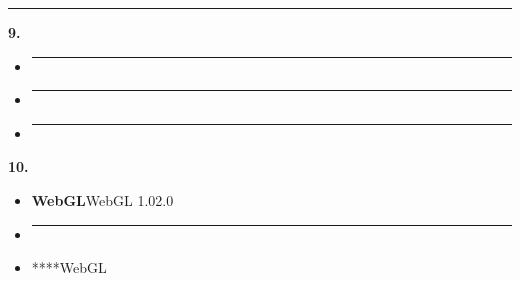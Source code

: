 \begin{center}\rule{0.5\linewidth}{0.5pt}\end{center}

\textbf{9. }

\begin{itemize}
\item
  \begin{center}\rule{0.5\linewidth}{0.5pt}\end{center}
\item
  \begin{center}\rule{0.5\linewidth}{0.5pt}\end{center}
\item
  \begin{center}\rule{0.5\linewidth}{0.5pt}\end{center}
\end{itemize}

\textbf{10. }

\begin{itemize}
\item
  \textbf{WebGL}WebGL 1.02.0
\item
  \begin{center}\rule{0.5\linewidth}{0.5pt}\end{center}
\item
  ****WebGL
\end{itemize}

\subsubsection{}\label{section-28}

